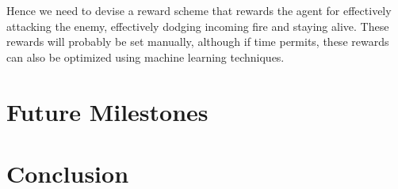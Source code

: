 \documentclass{article}
\theoremstyle{plain}
\theoremstyle{definition}
\theoremstyle{remark}
\begin{document}
Hence we need to devise a reward scheme that rewards the agent for effectively attacking the enemy, effectively dodging incoming fire and staying alive. These rewards will probably be set manually, although if time permits, these rewards can also be optimized using machine learning techniques.

\section{Future Milestones}

\section{Conclusion}



\end{document}
